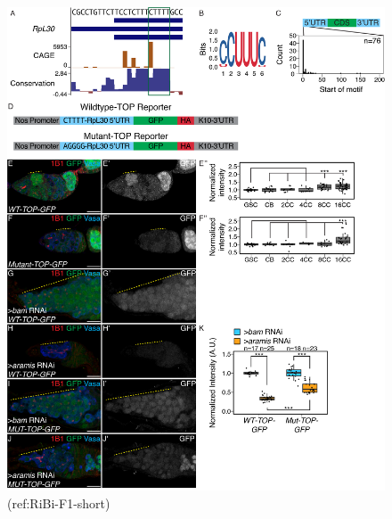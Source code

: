 \documentclass[12pt,oneside]{reedthesis}
\begin{document}
\begin{figure}

{\centering \includegraphics[width=6.5 in,height=8.9375 in]{./figure/Ribosome Biogenesis/Ribosome Biogenesis 6} 

}

\caption[(ref:RiBi-F1-short)]{(ref:RiBi-F1-short)}\label{fig:unnamed-chunk-16}
\end{figure}
\end{document}
